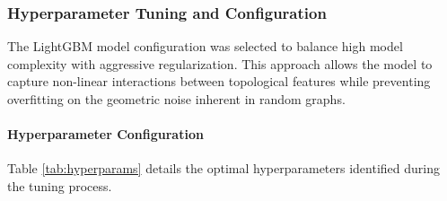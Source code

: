 \documentclass{article}
\begin{document}
\subsubsection{Hyperparameter Tuning and Configuration}

The LightGBM model configuration was selected to balance high model complexity with aggressive regularization. This approach allows the model to capture non-linear interactions between topological features while preventing overfitting on the geometric noise inherent in random graphs. 

\paragraph{Hyperparameter Configuration}
Table \ref{tab:hyperparams} details the optimal hyperparameters identified during the tuning process.
\end{document}
